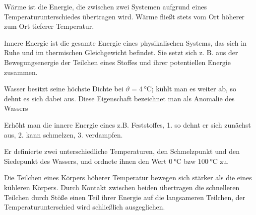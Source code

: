 \documentclass[a4paper]{article}
\begin{document}
\vspace{0.5 cm}


Wärme ist die Energie, die zwischen zwei Systemen aufgrund eines Temperaturunterschiedes übertragen wird. Wärme fließt stets vom Ort höherer zum Ort tieferer Temperatur.
\vspace{0.5 cm}


Innere Energie ist die gesamte Energie eines physikalischen Systems, das sich in Ruhe und im thermischen Gleichgewicht befindet. Sie setzt sich z. B. aus der Bewegungsenergie der Teilchen eines Stoffes und ihrer potentiellen Energie zusammen.
\vspace{0.5 cm}


Wasser besitzt seine höchste Dichte bei $\vartheta =\SI{4}{\celsius}$; kühlt man es weiter ab, so dehnt es sich dabei aus. Diese Eigenschaft bezeichnet man als Anomalie des Wassers
\vspace{0.5 cm}


Erhöht man die innere Energie eines z.B. Feststoffes, 1. so dehnt er sich zunächst aus, 2. kann schmelzen, 3. verdampfen.
\vspace{0.5 cm}


Er definierte zwei unterschiedliche Temperaturen, den Schmelzpunkt und den Siedepunkt des Wassers, und ordnete ihnen den Wert $\SI{0}{\celsius}$  bzw $\SI{100}{\celsius}$ zu. 
\vspace{0.5 cm}


Die Teilchen eines Körpers höherer Temperatur bewegen sich stärker als die eines kühleren Körpers. Durch Kontakt zwischen beiden übertragen die schnelleren Teilchen durch Stöße einen Teil ihrer Energie auf die langsameren Teilchen, der Temperaturunterschied wird schließlich ausgeglichen.   
\vspace{0.5 cm}
\end{document}
